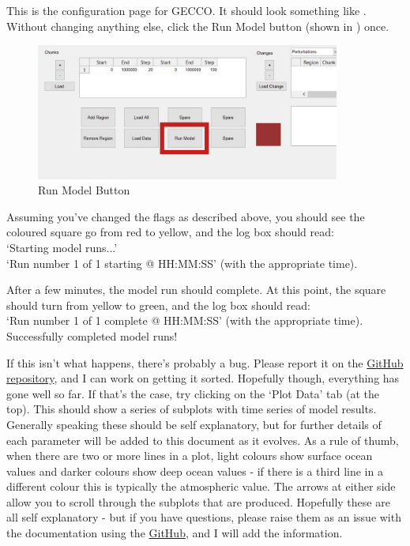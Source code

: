 \documentclass[12pt,twoside,onecolumn,a4paper]{article}
\begin{document}
This is the configuration page for GECCO. It should look something like . Without changing anything else, click the Run Model button (shown in ) once. 

\begin{figure}[H]
\centering
\includegraphics[width=10cm]{./Figures/Run_Model_Button.png}
\caption{Run Model Button}
\end{figure}


Assuming you've changed the flags as described above, you should see the coloured square go from red to yellow, and the log box should read: \\
`Starting model runs...' \\
`Run number 1 of 1 starting @ HH:MM:SS' (with the appropriate time).

After a few minutes, the model run should complete. At this point, the square should turn from yellow to green, and the log box should read: \\
`Run number 1 of 1 complete @ HH:MM:SS' (with the appropriate time). \\
Successfully completed model runs!

If this isn't what happens, there's probably a bug. Please report it on the \href{https://github.com/Sciross/GECCO/}{GitHub repository}, and I can work on getting it sorted. Hopefully though, everything has gone well so far. If that's the case, try clicking on the `Plot Data' tab (at the top). This should show a series of subplots with time series of model results. Generally speaking these should be self explanatory, but for further details of each parameter will be added to this document as it evolves. As a rule of thumb, when there are two or more lines in a plot, light colours show surface ocean values and darker colours show deep ocean values - if there is a third line in a different colour this is typically the atmospheric value. The arrows at either side allow you to scroll through the subplots that are produced. Hopefully these are all self explanatory - but if you have questions, please raise them as an issue with the documentation using the \href{https://github.com/Sciross/GECCO/}{GitHub}, and I will add the information.
\end{document}
